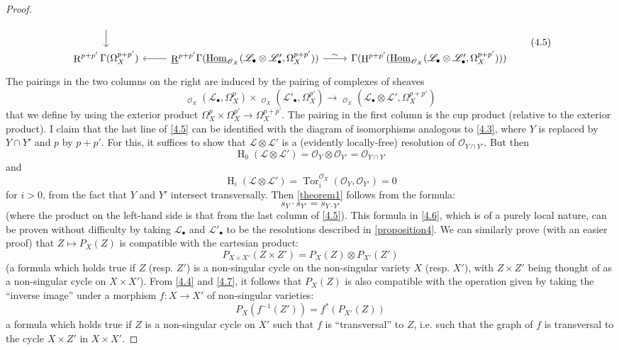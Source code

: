 \documentclass{article}
\theoremstyle{plain}
\theoremstyle{definition}
\newcommand{\sh}{\mathscr}
\DeclareMathOperator{\Tor}{Tor}
\DeclareMathOperator{\shHom}{\underline{Hom}}
\DeclareMathOperator{\RR}{R}
\DeclareMathOperator{\HH}{H}
\newcommand{\oldpage}[1]{\marginpar{\footnotesize$\Big\vert$ \textit{p.~#1}}}
\begin{document}
\begin{proof}
\[\begin{tikzcd}
        \dar
    \\\RR^{p+p'}\Gamma(\Omega_X^{p+p'})
      & \underline{\RR}^{p+p'}\Gamma(\shHom_{\sh{O}_X}(\sh{L}_\bullet\otimes\sh{L}'_\bullet,\Omega_X^{p+p'}))
        \lar \rar["\sim"]
      & \Gamma(\HH^{p+p'}(\shHom_{\sh{O}_X}(\sh{L}_\bullet\otimes\sh{L}'_\bullet,\Omega_X^{p+p'})))
    \end{tikzcd}
    \normalsize
  \tag{4.5}
  \]
\oldpage{149-12}
  The pairings in the two columns on the right are induced by the pairing of complexes of sheaves
  \[
    \shHom_{\sh{O}_X}(\sh{L}_\bullet,\Omega_X^p) \times \shHom_{\sh{O}_X}(\sh{L}'_\bullet,\Omega_X^{p'}) \to \shHom_{\sh{O}_X}(\sh{L}_\bullet\otimes\sh{L}',\Omega_X^{p+p'})
  \]
  that we define by using the exterior product $\Omega_X^p\times\Omega_X^{p'}\to\Omega_X^{p+p'}$.
  The pairing in the first column is the cup product (relative to the exterior product).
  I claim that the last line of \cref{4.5} can be identified with the diagram of isomorphisms analogous to \cref{4.3}, where $Y$ is replaced by $Y\cap Y'$ and $p$ by $p+p'$.
  For this, it suffices to show that $\sh{L}\otimes\sh{L}'$ is a (evidently locally-free) resolution of $\sh{O}_{Y\cap Y'}$.
  But then
  \[
    \HH_0(\sh{L}\otimes\sh{L}') = \sh{O}_Y\otimes\sh{O}_{Y'} = \sh{O}_{Y\cap Y'}
  \]
  and
  \[
    \HH_i(\sh{L}\otimes\sh{L}') = \Tor_i^{\sh{O}_X}(\sh{O}_Y,\sh{O}_{Y'}) = 0
  \]
  for $i>0$, from the fact that $Y$ and $Y'$ intersect transversally.
  Then \cref{theorem1} follows from the formula:
  \[
  \label{4.6}
    s_{Y}\cdot s_{Y'} = s_{Y\cdot Y'}
  \tag{4.6}
  \]
  (where the product on the left-hand side is that from the last column of \cref{4.5}).
  This formula in \cref{4.6}, which is of a purely local nature, can be proven without difficulty by taking $\sh{L}_\bullet$ and $\sh{L}'_\bullet$ to be the resolutions described in \cref{proposition4}.
  We can similarly prove (with an easier proof) that $Z\mapsto P_X(Z)$ is compatible with the cartesian product:
  \[
  \label{4.7}
    P_{X\times X'}(Z\times Z')  = P_X(Z)\otimes P_{X'}(Z')
  \tag{4.7}
  \]
  (a formula which holds true if $Z$ (resp. $Z'$) is a non-singular cycle on the non-singular variety $X$ (resp. $X'$), with $Z\times Z'$ being thought of as a non-singular cycle on $X\times X'$).
  From \cref{4.4} and \cref{4.7}, it follows that $P_X(Z)$ is also compatible with the operation given by taking the ``inverse image'' under a morphism $f\colon X\to X'$ of non-singular varieties:
  \[
  \label{4.8}
    P_X(f^{-1}(Z')) = f^*(P_{X'}(Z))
  \tag{4.8}
  \]
  a formula which holds true if $Z$ is a non-singular cycle on $X'$ such that $f$ is ``transversal'' to $Z$, i.e. such that the graph of $f$ is transversal to the cycle $X\times Z'$ in $X\times X'$.
\end{proof}
\end{document}
